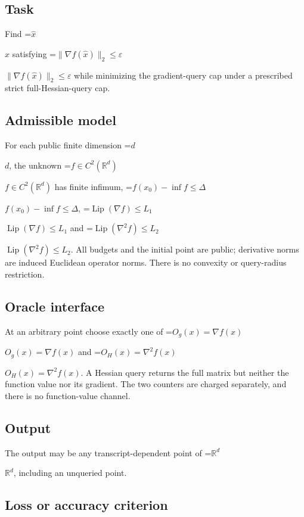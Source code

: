 \documentclass[10pt,a4paper]{article}
\newcommand{\AtlasMath}[1]{\par\begingroup\centering\setbox0=\hbox{$\displaystyle #1$}\ifdim\wd0>1.4\linewidth\typeout{ATLAS WIDE FORMULA: \the\wd0}\fi\ifdim\wd0>\linewidth\resizebox{\linewidth}{!}{\box0}\else\box0\fi\par\endgroup}
\newcommand{\AtlasInlineMath}[1]{\begingroup\setbox0=\hbox{$#1$}\ifdim\wd0>.4\linewidth\endgroup\AtlasMath{#1}\else\endgroup$#1$\fi}
\begin{document}
\subsection{Task}


Find \AtlasInlineMath{\widehat x} satisfying \AtlasInlineMath{\|\nabla f(\widehat x)\|_2\le\varepsilon} while minimizing the gradient-query cap under a prescribed strict full-Hessian-query cap.



\subsection{Admissible model}


For each public finite dimension \AtlasInlineMath{d}, the unknown \AtlasInlineMath{f\in C^2(\mathbb R^d)} has finite infimum, \AtlasInlineMath{f(x_0)-\inf f\le\Delta}, \AtlasInlineMath{\operatorname{Lip}(\nabla f)\le L_1} and \AtlasInlineMath{\operatorname{Lip}(\nabla^2f)\le L_2}. All budgets and the initial point are public; derivative norms are induced Euclidean operator norms. There is no convexity or query-radius restriction.



\subsection{Oracle interface}


At an arbitrary point choose exactly one of \AtlasInlineMath{O_g(x)=\nabla f(x)} and \AtlasInlineMath{O_H(x)=\nabla^2f(x)}. A Hessian query returns the full matrix but neither the function value nor its gradient. The two counters are charged separately, and there is no function-value channel.



\subsection{Output}


The output may be any transcript-dependent point of \AtlasInlineMath{\mathbb R^d}, including an unqueried point.



\subsection{Loss or accuracy criterion}
\end{document}
